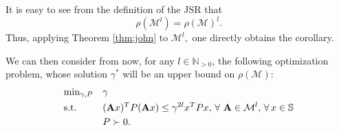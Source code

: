 \begin{pf}
It is easy to see from the definition of the JSR that $$\rho(\mathcal{M}^l)=\rho(\mathcal{M})^l.$$ Thus, applying Theorem \ref{thm:john} to $\mathcal{M}^l,$ one directly obtains the corollary.
\end{pf}
We can then consider from now, for any $l \in \mathbb{N}_{>0}$, the following optimization problem, whose solution $\gamma^{*}$ will be an upper bound on $\rho(\mathcal{M})$:
\begin{equation}\label{eqn:campiOpt2}
\begin{aligned}
& \text{min}_{\gamma, P} & & \gamma \\
& \text{s.t.} 
&  & (\mathbf{A} x)^T P(\mathbf{A} x) \leq \gamma^{2l} x^T P x,\,\forall\ \mathbf{A} \in \mathcal{M}^l, \,\forall\, x \in \mathbb{S}\\
& && P \succ 0. \\
\end{aligned}
\end{equation}